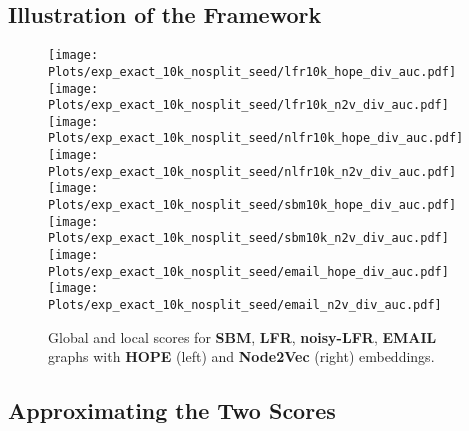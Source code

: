 \clearpage

\subsection{{Illustration of the Framework}}


 \begin{figure}[ht]
     \centering
     \texttt{[image: Plots/exp\_exact\_10k\_nosplit\_seed/lfr10k\_hope\_div\_auc.pdf]}
         \hspace{.1cm}
     \texttt{[image: Plots/exp\_exact\_10k\_nosplit\_seed/lfr10k\_n2v\_div\_auc.pdf]}
     \vspace{.1cm}
     \texttt{[image: Plots/exp\_exact\_10k\_nosplit\_seed/nlfr10k\_hope\_div\_auc.pdf]}
         \hspace{.1cm}
     \texttt{[image: Plots/exp\_exact\_10k\_nosplit\_seed/nlfr10k\_n2v\_div\_auc.pdf]}
     \vspace{.1cm}
     \texttt{[image: Plots/exp\_exact\_10k\_nosplit\_seed/sbm10k\_hope\_div\_auc.pdf]}
         \hspace{.1cm}
     \texttt{[image: Plots/exp\_exact\_10k\_nosplit\_seed/sbm10k\_n2v\_div\_auc.pdf]}
     \vspace{.1cm}
     \texttt{[image: Plots/exp\_exact\_10k\_nosplit\_seed/email\_hope\_div\_auc.pdf]}
         \hspace{.1cm}
     \texttt{[image: Plots/exp\_exact\_10k\_nosplit\_seed/email\_n2v\_div\_auc.pdf]}
     \caption{Global and local scores for \textbf{SBM}, \textbf{LFR}, \textbf{noisy-LFR}, \textbf{EMAIL} graphs with \textbf{HOPE} (left) and \textbf{Node2Vec} (right) embeddings.}
     \label{fig:10kexact_2measseed}
 \end{figure}

 \clearpage

\subsection{Approximating the Two Scores}

